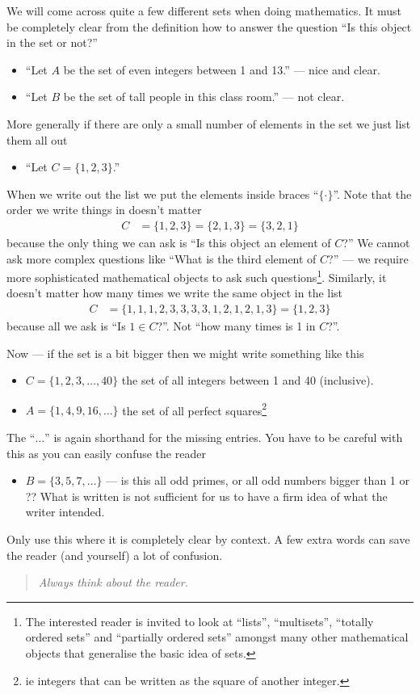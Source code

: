 We will come across quite a few different sets when doing
mathematics. It must be completely clear from the definition how
to answer the question ``Is this object in the set or not?''
\begin{itemize}
\item ``Let $A$ be the set of even integers between 1 and 13.'' --- nice and
clear.
\item ``Let $B$ be the set of tall people in this class room.'' --- not clear.
\end{itemize}
More generally if there are only a small number of elements in the set we just
list them all out
\begin{itemize}
\item ``Let $C = \{1,2,3\}$.''
\end{itemize}
When we write out the list we put the elements inside braces ``$\{ \cdot \}$''.
Note that the order we write things in doesn't matter
\begin{align*}
  C & = \{1,2,3\} = \{2,1,3\} = \{3,2,1\}
\end{align*}
because the only thing we can ask is ``Is this object an element of $C$?'' We
cannot ask more complex questions like ``What is the third element of $C$?'' ---
we require more sophisticated mathematical objects to ask such
questions\footnote{The interested reader is invited to look at ``lists'',
``multisets'', ``totally ordered sets'' and ``partially ordered sets''
amongst many other mathematical objects that generalise the basic idea of
sets.}. Similarly, it doesn't matter how many times we write the same object in
the list
\begin{align*}
  C &= \{1,1,1,2,3,3,3,3,1,2,1,2,1,3\} = \{1,2,3\}
\end{align*}
because all we ask is ``Is $1 \in C$?''. Not ``how many times is 1 in $C$?''.

Now --- if the set is a bit bigger then we might write something like this
\begin{itemize}
\item $C = \{1,2,3,\dots,40\}$ the set of all integers between 1 and 40
(inclusive).
\item $A = \{1,4,9,16,\dots\}$ the set of all perfect squares\footnote{ie
integers that can be written as the square of another integer.}
\end{itemize}
The ``$\dots$'' is again shorthand for the missing entries. You have to be
careful with this as you can easily confuse the reader
\begin{itemize}
\item $B = \{3,5,7,\dots\}$ --- is this all odd primes, or all odd numbers
bigger than 1 or ?? What is written is not sufficient for us to have a firm
idea of what the writer intended.
\end{itemize}
Only use this where it is completely clear by context. A few extra words can
save the reader (and yourself) a lot of confusion.
\begin{quote}
 \emph{Always think about the reader.}
\end{quote}



